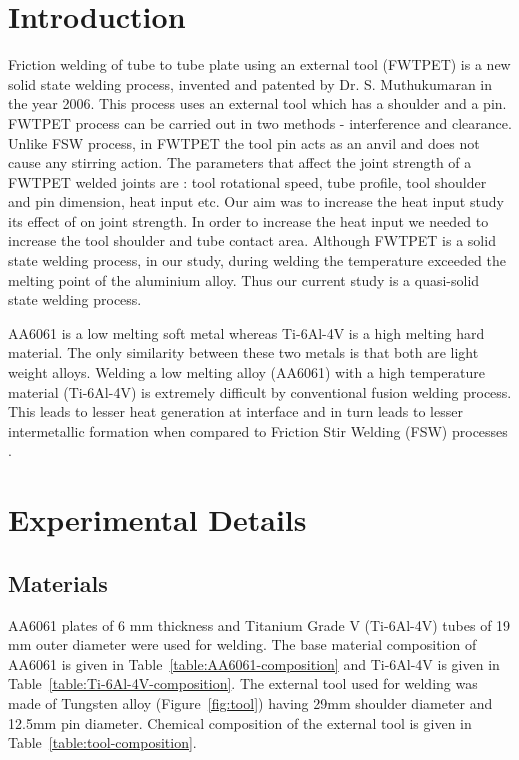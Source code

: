 \documentclass[preprint]{elsarticle}
\begin{document}
\linenumbers
								
\section{Introduction}
\label{sec:Introduction}
Friction welding of tube to tube plate using an external tool (FWTPET) is a new solid state welding process, invented and patented by Dr. S. Muthukumaran in the year 2006. This process uses an external tool which has a shoulder and a pin. FWTPET process can be carried out in two methods - interference and clearance. Unlike FSW process, in FWTPET the tool pin acts as an anvil and does not cause any stirring action\cite{SenthilKumaran2011}. The parameters that affect the joint strength of a FWTPET welded joints are : tool rotational speed, tube profile, tool shoulder and pin dimension, heat input etc. Our aim was to increase the heat input study its effect of on joint strength. In order to increase the heat input we needed to increase the tool shoulder and tube contact area. 
Although FWTPET is a solid state welding process, in our study, during welding the temperature exceeded the melting point of the aluminium alloy. Thus our current study is a quasi-solid state welding process. 
\par 
AA6061 is a low melting soft metal whereas Ti-6Al-4V is a high melting hard material. The only similarity between these two metals is that both are light weight alloys. Welding a low melting alloy (AA6061) with a high temperature material (Ti-6Al-4V) is extremely difficult by conventional fusion welding process. This leads to lesser heat generation at interface and in turn leads to lesser intermetallic formation when compared to Friction Stir Welding (FSW) processes \cite{MadhusudhanReddy2009}.


\section{Experimental Details} 
\label{sec:Experimental Details}
\subsection{Materials}
\label{subsec:Materials}
AA6061 plates of 6 mm thickness and Titanium Grade V (Ti-6Al-4V) tubes of 19 mm outer diameter were used for welding. The base material composition of AA6061 is given in Table~\ref{table:AA6061-composition} and Ti-6Al-4V is given in Table~\ref{table:Ti-6Al-4V-composition}. The external tool used for welding was made of Tungsten alloy (Figure~\ref{fig:tool}) having 29mm shoulder diameter and 12.5mm pin diameter. Chemical composition of the external tool is given in Table~\ref{table:tool-composition}. 
\end{document}
